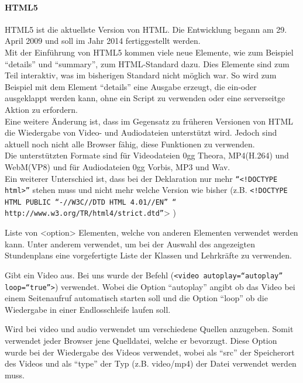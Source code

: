\paragraph{HTML5}
HTML5 ist die aktuellste Version von HTML. Die Entwicklung begann am 29. April 2009 und soll im Jahr 2014 fertiggestellt werden.\\ 
Mit der Einführung von HTML5 kommen viele neue Elemente, wie zum Beispiel \enquote{details} und \enquote{summary}, zum HTML-Standard dazu. Dies Elemente sind zum Teil interaktiv, was im bisherigen Standard nicht möglich war. So wird zum Beispiel mit dem Element \enquote{details} eine Ausgabe erzeugt, die ein-oder ausgeklappt werden kann, ohne ein Script zu verwenden oder eine serverseitge Aktion zu erfordern.\\
Eine weitere Änderung ist, dass im Gegensatz zu früheren Versionen von HTML die Wiedergabe von Video- und Audiodateien unterstützt wird. Jedoch sind aktuell noch nicht alle Browser fähig, diese Funktionen zu verwenden.\\
Die unterstützten Formate sind für Videodateien 0gg Theora, MP4(H.264) und WebM(VP8) und für Audiodateien 0gg Vorbis, MP3 und Wav. \\
Ein weiterer Unterschied ist, dass bei der Deklaration nur mehr \texttt{\enquote{<!DOCTYPE html>}} stehen muss und nicht mehr welche Version wie bisher (z.B. \texttt{<!DOCTYPE HTML PUBLIC \enquote{-//W3C//DTD HTML 4.01//EN} \enquote{ http://www.w3.org/TR/html4/strict.dtd}}> )
\begin{description}[style=nextline]
\item[in SIS verwendete Funktionen:]
\item[datalist] Liste von <option> Elementen, welche von anderen Elementen verwendet werden kann. Unter anderem verwendet, um bei der Auswahl des angezeigten Stundenplans eine vorgefertigte Liste der Klassen und Lehrkräfte zu verwenden.
\item[video] Gibt ein Video aus. Bei uns wurde der Befehl (\texttt{<video autoplay=\enquote{autoplay} loop=\enquote{true}>}) verwendet. Wobei die Option \enquote{autoplay} angibt ob das Video bei einem Seitenaufruf automatisch starten soll und die Option \enquote{loop} ob die Wiedergabe in einer Endlosschleife laufen  soll.
\item[source] Wird bei video und audio verwendet um verschiedene Quellen anzugeben. Somit verwendet jeder Browser jene Quelldatei, welche er bevorzugt. Diese Option wurde bei der Wiedergabe des Videos verwendet, wobei als \enquote{src} der Speicherort des Videos und als \enquote{type} der Typ (z.B. video/mp4) der Datei verwendet werden muss. 
\end{description}